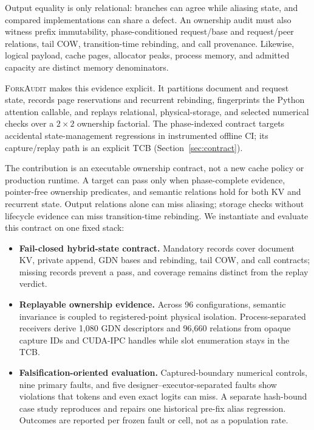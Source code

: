 \documentclass{article}
\newcommand{\method}{\textsc{ForkAudit}}
\begin{document}
Output equality is only relational: branches can agree while aliasing state,
and compared implementations can share a defect.  An ownership audit must also
witness prefix immutability, phase-conditioned request/base and request/peer
relations, tail COW, transition-time rebinding, and call provenance.  Likewise,
logical payload, cache pages, allocator peaks, process memory, and admitted
capacity are distinct memory denominators.

\method{} makes this evidence explicit.  It partitions document and request
state, records page reservations and recurrent rebinding, fingerprints the
Python attention callable, and replays relational, physical-storage, and
selected numerical checks over a $2\times2$ ownership factorial.  The
phase-indexed contract targets accidental state-management regressions in
instrumented offline CI; its capture/replay path is an explicit TCB
(Section~\ref{sec:contract}).

The contribution is an executable ownership contract, not a new cache policy
or production runtime.  A target can pass only when phase-complete evidence,
pointer-free ownership predicates, and semantic relations hold for both KV and
recurrent state.  Output relations alone can miss aliasing; storage checks
without lifecycle evidence can miss transition-time rebinding.  We instantiate
and evaluate this contract on one fixed stack:
\begin{itemize}
  \setlength{\itemsep}{1pt}
  \setlength{\parskip}{0pt}
  \item \textbf{Fail-closed hybrid-state contract.} Mandatory records cover
  document KV, private append, GDN bases and rebinding, tail COW, and call
  contracts; missing records prevent a pass, and coverage remains distinct
  from the replay verdict.
  \item \textbf{Replayable ownership evidence.} Across 96 configurations,
  semantic invariance is coupled to registered-point physical isolation.
  Process-separated receivers derive 1,080 GDN descriptors and 96,660 relations
  from opaque capture IDs and CUDA-IPC handles while slot enumeration stays in
  the TCB.
  \item \textbf{Falsification-oriented evaluation.} Captured-boundary numerical
  controls, nine primary faults, and five designer--executor-separated faults
  show violations that tokens and even exact logits can miss.  A separate
  hash-bound case study reproduces and repairs one historical pre-fix alias
  regression.  Outcomes are reported per frozen fault or cell, not as a
  population rate.
\end{itemize}
\end{document}
